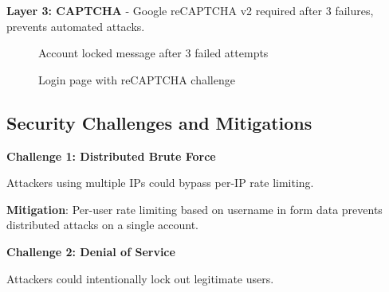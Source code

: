 \documentclass[12pt,a4paper]{article}
\begin{document}
\textbf{Layer 3: CAPTCHA} - Google reCAPTCHA v2 required after 3 failures, prevents automated attacks.

\begin{figure}[H]
    \centering
    \caption{Account locked message after 3 failed attempts}
    \label{fig:lockout_screen}
\end{figure}

\begin{figure}[H]
    \centering
    \caption{Login page with reCAPTCHA challenge}
    \label{fig:captcha}
\end{figure}

\subsection{Security Challenges and Mitigations}

\textbf{Challenge 1: Distributed Brute Force}

Attackers using multiple IPs could bypass per-IP rate limiting.

\textbf{Mitigation}: Per-user rate limiting based on username in form data prevents distributed attacks on a single account.

\textbf{Challenge 2: Denial of Service}

Attackers could intentionally lock out legitimate users.
\end{document}
